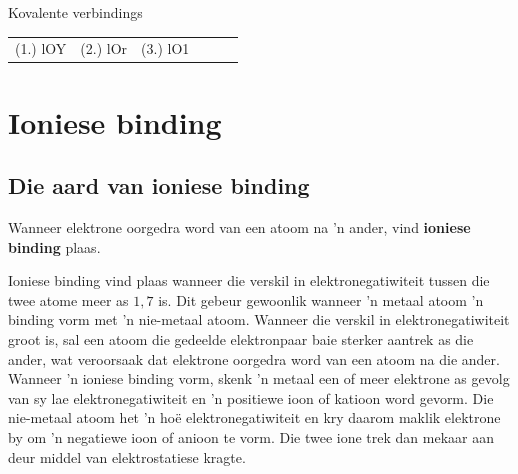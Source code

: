\begin{exercises}{Kovalente verbindings}
{\practiceinfo
 \par \begin{tabular}[h]{cccccc}
 (1.) lOY  &  (2.) lOr  &  (3.) lO1  & \end{tabular}
}
\end{exercises}

         \section{Ioniese binding}
    \nopagebreak


            \subsection*{Die aard van ioniese binding}
            \nopagebreak
        \label{m38684*id142190}Wanneer elektrone oorgedra word van een atoom na 'n ander, vind \textbf{ioniese binding} plaas.\par 
        \label{m38684*id142218}
Ioniese binding vind plaas wanneer die verskil in elektronegatiwiteit tussen die twee atome meer as $1,7$ is. Dit gebeur gewoonlik wanneer 'n metaal atoom  'n binding vorm met 'n nie-metaal atoom. Wanneer die verskil in elektronegatiwiteit groot is, sal een atoom die gedeelde elektronpaar baie sterker aantrek as die ander, wat veroorsaak dat elektrone oorgedra word van een atoom na die ander. Wanneer  'n ioniese binding vorm, skenk  'n metaal een of meer elektrone as gevolg van sy lae elektronegatiwiteit en  'n positiewe ioon of katioon word gevorm. Die nie-metaal atoom het 'n hoë elektronegatiwiteit en kry daarom maklik elektrone by om  'n negatiewe ioon of anioon te vorm. Die twee ione trek dan mekaar aan deur middel van elektrostatiese kragte.\par 


